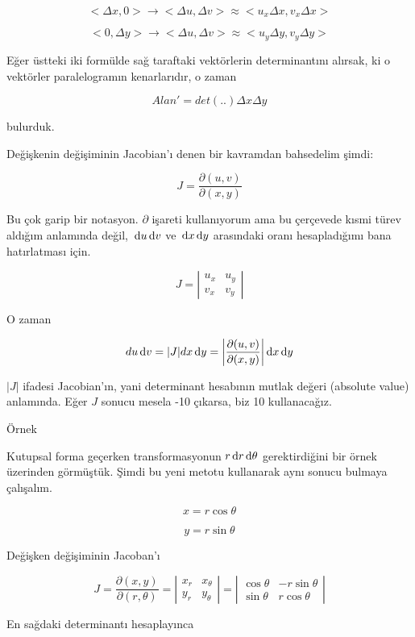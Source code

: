 \documentclass[12pt,fleqn]{article}\usepackage{../../common}
\begin{document}
$$< \Delta x,0 > \to < \Delta u, \Delta v > \approx < u_x \Delta x, v_x\Delta x > $$

$$ < 0, \Delta y > \to < \Delta u,\Delta v > \approx < u_y\Delta y,v_y \Delta y > $$

Eğer üstteki iki formülde sağ taraftaki vektörlerin determinantını alırsak,
ki o vektörler paralelogramın kenarlarıdır, o zaman 

$$ Alan' =  det(..)\Delta x \Delta y  $$

bulurduk. 

Değişkenin değişiminin Jacobian'ı denen bir kavramdan bahsedelim şimdi: 

$$ J = \frac{\partial (u,v)}{\partial(x,y)} $$

Bu çok garip bir notasyon. $\partial$ işareti kullanıyorum ama bu çerçevede
kısmi türev aldığım anlamında değil, $\,\mathrm{d} u \,\mathrm{d} v$ ve $\,\mathrm{d} x \,\mathrm{d} y$ arasındaki
oranı hesapladığımı bana hatırlatması için.

$$ J =  \left|\begin{array}{rr}
u_x & u_y \\
v_x & v_y
\end{array}\right|
$$

O zaman 

$$ du \,\mathrm{d} v = |J| dx \,\mathrm{d} y =
\bigg|\frac{\partial (u,v)}{\partial(x,y)}\bigg |
\,\mathrm{d} x \,\mathrm{d} y
$$

$|J|$ ifadesi Jacobian'ın, yani determinant hesabının mutlak değeri (absolute
value) anlamında. Eğer $J$ sonucu mesela -10 çıkarsa, biz 10 kullanacağız.

Örnek 

Kutupsal forma geçerken transformasyonun $r \,\mathrm{d} r \,\mathrm{d} \theta$ gerektirdiğini
bir örnek üzerinden görmüştük. Şimdi bu yeni metotu kullanarak aynı sonucu
bulmaya çalışalım. 

$$  x= r \cos \theta $$

$$  y= r \sin\theta $$

Değişken değişiminin Jacoban'ı

$$ J = \frac{\partial (x,y)}{\partial(r,\theta)}  =
\left|\begin{array}{rr}
x_r & x_\theta \\
y_r & y_\theta
\end{array}\right|   =
\left|\begin{array}{rr}
\cos\theta & -r\sin\theta\\
\sin\theta & r\cos\theta
\end{array}\right|
$$

En sağdaki determinantı hesaplayınca
\end{document}
